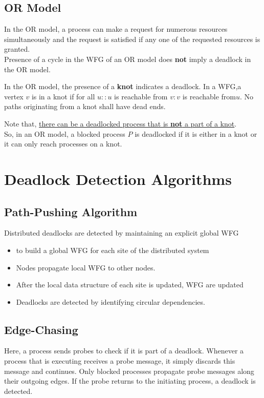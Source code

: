 \subsection{OR Model}
In the OR model, a process can make a request for numerous resources simultaneously and the request is satisfied if any one of the requested resources is granted.\\
Presence of a cycle in the WFG of an OR model does \textbf{not} imply a deadlock in the OR model.

In the OR model, the presence of a \textbf{knot} indicates a deadlock. In a WFG,a vertex $v$ is in a knot if for all $u::u$ is reachable from $v:v$ is reachable from$u$. No paths originating from a knot shall have dead ends.

Note that, \ul{there can be a deadlocked process that is \textbf{not} a part of a knot}.\\
So, in an OR model, a blocked process $P$ is deadlocked if it is either in a knot or it can only reach processes on a knot.

\section{Deadlock Detection Algorithms}
\subsection{Path-Pushing Algorithm}
Distributed deadlocks are detected by
maintaining an explicit global WFG
\begin{itemize}
	\item to build a global WFG for each site of the
distributed system
	\item Nodes propagate local WFG to other nodes.
	\item After the local data structure of each site is
updated, WFG are updated
	\item Deadlocks are detected by identifying circular
dependencies.
\end{itemize}

\subsection{Edge-Chasing}
Here, a process sends probes to check if it is part of a deadlock.
Whenever a process that is executing receives a probe message, it simply discards this message and continues. Only blocked processes propagate probe messages along their outgoing edges. If the probe returns to the initiating process, a deadlock is detected.


